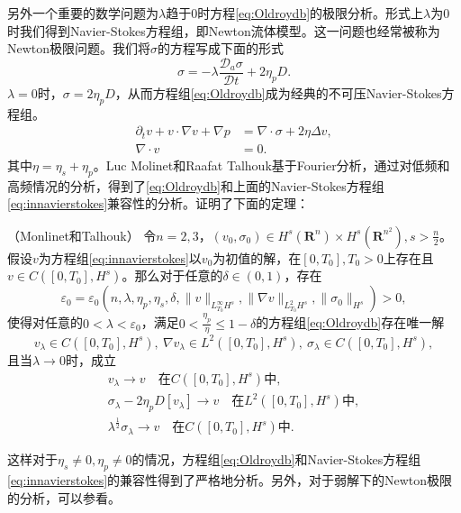 另外一个重要的数学问题为$\lambda$趋于$0$时方程\eqref{eq:Oldroydb}的极限分析。形式上$\lambda$为$0$时我们得到Navier-Stokes方程组，即Newton流体模型。这一问题也经常被称为Newton极限问题。我们将$\sigma$的方程写成下面的形式
\begin{equation*}
	 \sigma = -	\lambda \frac{\mathcal{D}_a \sigma}{\mathcal{D} t} +  2 \eta_p D.
\end{equation*}
$\lambda=0$时，$\sigma= 2 \eta_p D$，从而方程组\eqref{eq:Oldroydb}成为经典的不可压Navier-Stokes方程组。
\begin{subequations} \label{eq:innavierstokes}
\begin{align}
	\partial_t v + v \cdot \nabla v  + \nabla p &= \nabla \cdot \sigma + 2 \eta \Delta v, \\
	\nabla \cdot v &= 0.
\end{align}
\end{subequations}
其中$\eta= \eta_s + \eta_p$。Luc Molinet和Raafat Talhouk基于Fourier分析，通过对低频和高频情况的分析，得到了\eqref{eq:Oldroydb}和上面的Navier-Stokes方程组\eqref{eq:innavierstokes}兼容性的分析。证明了下面的定理：
\begin{theorem}（Monlinet和Talhouk\cite{molinet2008newtonian}）
	令$n=2,3$，$(v_0,\sigma_0) \in H^s(\mathbf{R}^n) \times H^s(\mathbf{R}^{n^2}), s>\frac{n}{2}$。假设$v$为方程组\eqref{eq:innavierstokes}以$v_0$为初值的解，在$[0,T_0],T_0>0$上存在且$v \in C([0,T_0],H^s)$。那么对于任意的$\delta \in (0,1)$，存在
	\begin{equation*}
		\varepsilon_0 = \varepsilon_0 (n,\lambda,\eta_p,\eta_s,\delta, \|v\|_{{L_{T_0}^\infty}H^s}, \|\nabla v\|_{{L^2_{T_0}}H^s}, \|\sigma_0\|_{H^s}) >0,
	\end{equation*}
	使得对任意的$0 < \lambda < \varepsilon_0$，满足$0 < \frac{\eta_p}{\eta} \le 1- \delta$的方程组\eqref{eq:Oldroydb}存在唯一解
	\begin{equation*}
		v_\lambda \in C([0,T_0],H^s),\ \nabla v_{\lambda} \in L^2([0,T_0],H^s), \ \sigma_{\lambda} \in C ([0,T_0],H^s),
	\end{equation*}
	且当$\lambda \rightarrow 0$时，成立
	\begin{eqnarray*}
		v_\lambda \rightarrow v \quad \text{在} C([0,T_0],H^s) \text{中}, \\ 
		\sigma_\lambda - 2\eta_p D[v_\lambda]  \rightarrow v \quad \text{在} L^2([0,T_0],H^s) \text{中}, \\ 
		\lambda^{\frac{1}{2}} \sigma_\lambda \rightarrow v \quad \text{在} C([0,T_0],H^s) \text{中}.
	\end{eqnarray*}
\end{theorem}
这样对于$\eta_s \neq 0, \eta_p \neq 0$的情况，方程组\eqref{eq:Oldroydb}和Navier-Stokes方程组\eqref{eq:innavierstokes}的兼容性得到了严格地分析。另外，对于弱解下的Newton极限的分析，可以参看\cite{bresch2014newtonian}。


